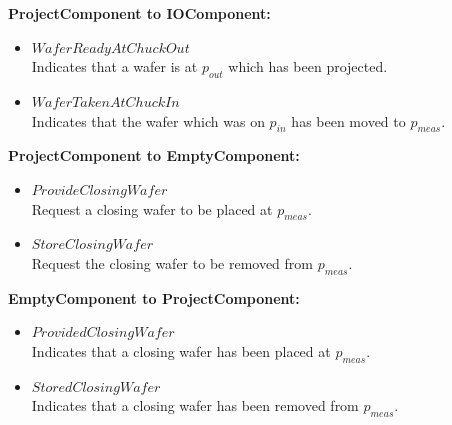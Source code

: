\textbf{ProjectComponent to IOComponent:}
\begin{itemize}
    \item $\mathit{WaferReadyAtChuckOut}$\\
    Indicates that a wafer is at $p_\mathit{out}$ which has been projected.
    \item $\mathit{WaferTakenAtChuckIn}$\\
    Indicates that the wafer which was on $p_\mathit{in}$ has been moved to $p_\mathit{meas}$.
\end{itemize}

\textbf{ProjectComponent to EmptyComponent:}
\begin{itemize}
    \item $\mathit{ProvideClosingWafer}$\\
    Request a closing wafer to be placed at $p_\mathit{meas}$.
    \item $\mathit{StoreClosingWafer}$\\
    Request the closing wafer to be removed from $p_\mathit{meas}$.
\end{itemize}

\textbf{EmptyComponent to ProjectComponent:}
\begin{itemize}
    \item $\mathit{ProvidedClosingWafer}$\\
    Indicates that a closing wafer has been placed at $p_\mathit{meas}$.
    \item $\mathit{StoredClosingWafer}$\\
    Indicates that a closing wafer has been removed from $p_\mathit{meas}$.
\end{itemize}
